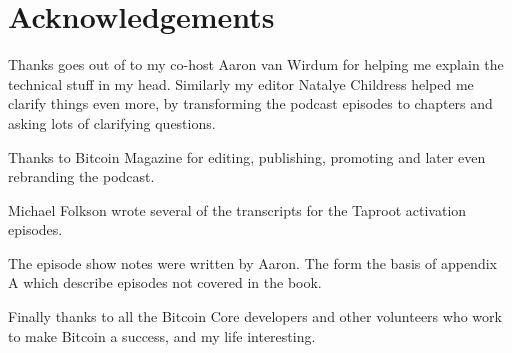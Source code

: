 \chapter{Acknowledgements}

Thanks goes out of to my co-host Aaron van Wirdum for helping me explain the technical stuff in my head. Similarly my editor Natalye Childress helped me clarify things even more, by transforming the podcast episodes to chapters and asking lots of clarifying questions.

Thanks to Bitcoin Magazine for editing, publishing, promoting and later even rebranding the podcast.

Michael Folkson wrote several of the transcripts for the Taproot activation episodes.

The episode show notes were written by Aaron. The form the basis of appendix A which describe episodes not covered in the book.

Finally thanks to all the Bitcoin Core developers and other volunteers who work to make Bitcoin a success, and my life interesting.

\newpage

\ %

\newpage
